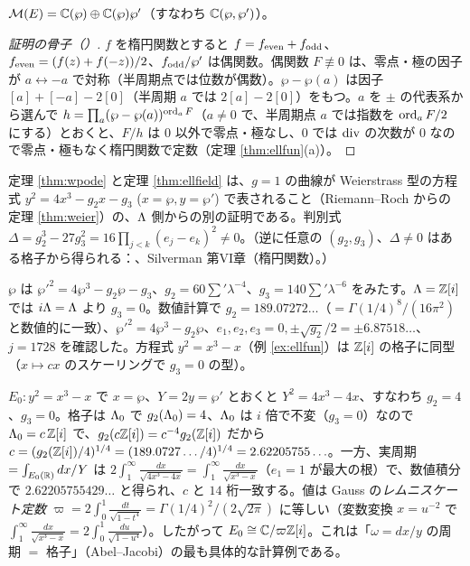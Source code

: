 \begin{thm}[楕円関数体]\label{thm:ellfield}
$\mathcal M(E)=\mathbb C(\wp)\oplus\mathbb C(\wp)\wp'$（すなわち $\mathbb C(\wp,\wp')$）。
\end{thm}
\begin{proof}[証明の骨子（\tP）]
$f$ を楕円関数とすると $f=f_{\rm even}+f_{\rm odd}$、$f_{\rm even}=(f(z)+f(-z))/2$、$f_{\rm odd}/\wp'$ は偶関数。偶関数 $F\not\equiv0$ は、零点・極の因子が $a\leftrightarrow-a$ で対称（半周期点では位数が偶数）。$\wp-\wp(a)$ は因子 $[a]+[-a]-2[0]$（半周期 $a$ では $2[a]-2[0]$）をもつ。$a$ を $\pm$ の代表系から選んで $h=\prod_a(\wp-\wp(a))^{\operatorname{ord}_aF}$（$a\ne0$ で、半周期点 $a$ では指数を $\operatorname{ord}_aF/2$ にする）とおくと、$F/h$ は $0$ 以外で零点・極なし、$0$ では $\operatorname{div}$ の次数が $0$ なので零点・極もなく楕円関数で定数（定理 \ref{thm:ellfun}(a)）。 
\end{proof}
定理 \ref{thm:wpode} と定理 \ref{thm:ellfield} は、$g=1$ の曲線が Weierstrass 型の方程式 $y^2=4x^3-g_2x-g_3$ ($x=\wp,y=\wp'$) で表されること（Riemann--Roch からの定理 \ref{thm:weier}）の、$\Lambda$ 側からの別の証明である。判別式 $\Delta=g_2^3-27g_3^2=16\prod_{j<k}(e_j-e_k)^2\ne0$。（逆に任意の $(g_2,g_3)$、$\Delta\ne0$ はある格子から得られる：\tC、Silverman 第VI章（楕円関数）。）

\begin{ex}[$\Lat=\Z+\Z i$]\label{ex:wp}
$\wp$ は $\wp'^2=4\wp^3-g_2\wp-g_3$、$g_2=60\sum'\lambda^{-4}$、$g_3=140\sum'\lambda^{-6}$ をみたす。$\Lambda=\mathbb Z[i]$ では $i\Lambda=\Lambda$ より $g_3=0$。数値計算で $g_2=189.07272\ldots$（$=\Gamma(1/4)^8/(16\pi^2)$ と数値的に一致）、$\wp'^2=4\wp^3-g_2\wp$、$e_1,e_2,e_3=0,\pm\sqrt{g_2}/2=\pm6.87518\ldots$、$j=1728$ を確認した。方程式 $y^2=x^3-x$（例 \ref{ex:ellfun}）は $\mathbb Z[i]$ の格子に同型（$x\mapsto cx$ のスケーリングで $g_3=0$ の型）。
\end{ex}

\begin{ex}[$y^2=x^3-x$ の周期格子]\label{ex:periodE0}
$E_0:y^2=x^3-x$ で $x=\wp$、$Y=2y=\wp'$ とおくと $Y^2=4x^3-4x$、すなわち $g_2=4$、$g_3=0$。格子は $\Lambda_0$ で $g_2(\Lambda_0)=4$、$\Lambda_0$ は $i$ 倍で不変（$g_3=0$）なので $\Lambda_0=c\,\mathbb Z[i]$ で、$g_2(c\mathbb Z[i])=c^{-4}g_2(\mathbb Z[i])$ だから $c=(g_2(\mathbb Z[i])/4)^{1/4}=(189.0727\ldots/4)^{1/4}=2.62205755\ldots$。一方、実周期 $=\int_{E_0(\mathbb R)}dx/Y$ は $2\int_1^\infty\frac{dx}{\sqrt{4x^3-4x}}=\int_1^\infty\frac{dx}{\sqrt{x^3-x}}$（$e_1=1$ が最大の根）で、数値積分で $2.62205755429\ldots$ と得られ、$c$ と $14$ 桁一致する。値は Gauss の\emph{レムニスケート定数} $\varpi=2\int_0^1\frac{dt}{\sqrt{1-t^4}}=\Gamma(1/4)^2/(2\sqrt{2\pi})$ に等しい（変数変換 $x=u^{-2}$ で $\int_1^\infty\frac{dx}{\sqrt{x^3-x}}=2\int_0^1\frac{du}{\sqrt{1-u^4}}$）。したがって $E_0\cong\mathbb C/\varpi\mathbb Z[i]$。これは「$\omega=dx/y$ の周期 $=$ 格子」（Abel--Jacobi）の最も具体的な計算例である。
\end{ex}

